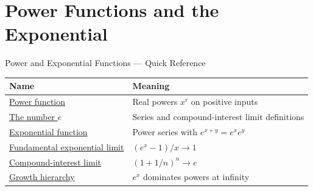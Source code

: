 \section{Power Functions and the Exponential}

\begin{toolkitbox}{Power and Exponential Functions --- Quick Reference}
\small
\begin{tabular}{l l}
\toprule
\textbf{Name} & \textbf{Meaning} \\
\midrule
\hyperref[def:power-function]{Power function} & Real powers \(x^r\) on positive inputs \\
\hyperref[def:number-e]{The number \(e\)} & Series and compound-interest limit definitions \\
\hyperref[def:exponential]{Exponential function} & Power series with \(e^{x+y}=e^xe^y\) \\
\hyperref[prop:limit-exponential-fundamental]{Fundamental exponential limit} & \((e^x-1)/x\to 1\) \\
\hyperref[prop:limit-compound-interest]{Compound-interest limit} & \((1+1/n)^n\to e\) \\
\hyperref[prop:exponential-dominates-power]{Growth hierarchy} & \(e^x\) dominates powers at infinity \\
\bottomrule
\end{tabular}
\end{toolkitbox}


